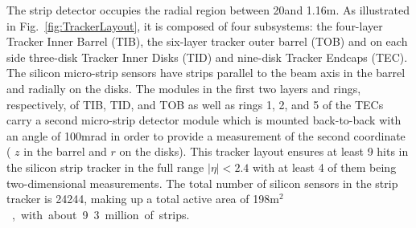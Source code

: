 The strip detector occupies the radial region between 20\cm and 1.16\unit{m}. As illustrated in Fig.~\ref{fig:TrackerLayout}, it is composed of four subsystems: the four-layer Tracker Inner Barrel (TIB), the six-layer tracker outer barrel (TOB) and on each side three-disk Tracker Inner Disks (TID) and nine-disk Tracker Endcaps (TEC). The silicon micro-strip sensors have strips parallel to the beam axis in the barrel and radially on the disks. The modules in the first two layers and rings, respectively, of TIB, TID, and TOB as well as rings 1, 2, and 5 of the TECs carry a second micro-strip detector module which is mounted back-to-back with an angle of 100\unit{mrad} in order to provide a measurement of the second coordinate ( $z$ in the barrel and $r$ on the disks). This tracker layout ensures at least 9 hits in the silicon strip tracker in the full range $|\eta| < 2.4$ with at least 4 of them being two-dimensional measurements. The total number of silicon sensors in the strip tracker is 24244, making up a total active area of 198\unit{m$^2$}, with about 9.3 million of strips.

